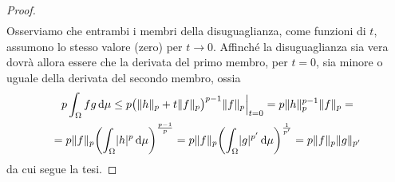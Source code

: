 \begin{proof}
\begin{multline}
    \end{multline}
    Osserviamo che entrambi i membri della disuguaglianza, come funzioni di $t$, assumono lo stesso valore (zero) per $t\to 0$.
    Affinch\'e la disuguaglianza sia vera dovrà allora essere che la derivata del primo membro, per $t=0$, sia minore o uguale della derivata del secondo membro, ossia
    \begin{multline}
        p\int_\Omega fg\,\textup{d}\mu\le
        p\bigl(\lVert h\rVert_p+t\lVert f\rVert_p\bigr)^{p-1}\lVert f\rVert_p\Big\rvert_{t=0}=
        p\lVert h\rVert_p^{p-1}\lVert f\rVert_p=\\=
        p\lVert f\rVert_p\biggl(\int_\Omega \lvert h\rvert^p\,\textup{d}\mu\biggr)^{\frac{p-1}{p}}=
        p\lVert f\rVert_p\biggl(\int_\Omega \lvert g\rvert^{p'}\,\textup{d}\mu\biggr)^{\frac1{p'}}=p\lVert f\rVert_p\lVert g\rVert_{p'}
    \end{multline}
    da cui segue la tesi.
\end{proof}
